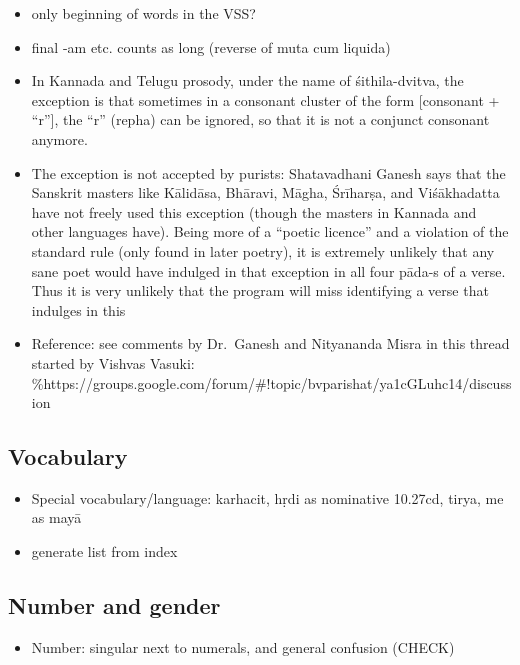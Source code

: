 \documentclass[12pt]{book}
\begin{document}
\begin{itemize}
\item
  only beginning of words in the VSS?
\item
  final -am etc. counts as long (reverse of muta cum liquida)
\item
  In Kannada and Telugu prosody, under the name of śithila-dvitva, the
  exception is that sometimes in a consonant cluster of the form
  {[}consonant + ``r''{]}, the ``r'' (repha) can be ignored, so that it
  is not a conjunct consonant anymore.
\item
  The exception is not accepted by purists: Shatavadhani Ganesh says
  that the Sanskrit masters like Kālidāsa, Bhāravi, Māgha, Śrīharṣa, and
  Viśākhadatta have not freely used this exception (though the masters
  in Kannada and other languages have). Being more of a ``poetic
  licence'' and a violation of the standard rule (only found in later
  poetry), it is extremely unlikely that any sane poet would have
  indulged in that exception in all four pāda-s of a verse. Thus it is
  very unlikely that the program will miss identifying a verse that
  indulges in this
\item
  Reference: see comments by Dr.~Ganesh and Nityananda Misra in this
  thread started by Vishvas Vasuki:
  \%https://groups.google.com/forum/\#!topic/bvparishat/ya1cGLuhc14/discussion
\end{itemize}

{%
\subsection{Vocabulary}\label{vocabulary}}

\begin{itemize}

\item
  Special vocabulary/language: karhacit, hṛdi as nominative 10.27cd,
  tirya, me as mayā
\item
  generate list from index
\end{itemize}

{%
\subsection{Number and gender}\label{number-and-gender}}

\begin{itemize}

\item
  Number: singular next to numerals, and general confusion (CHECK)
\end{itemize}
\end{document}
